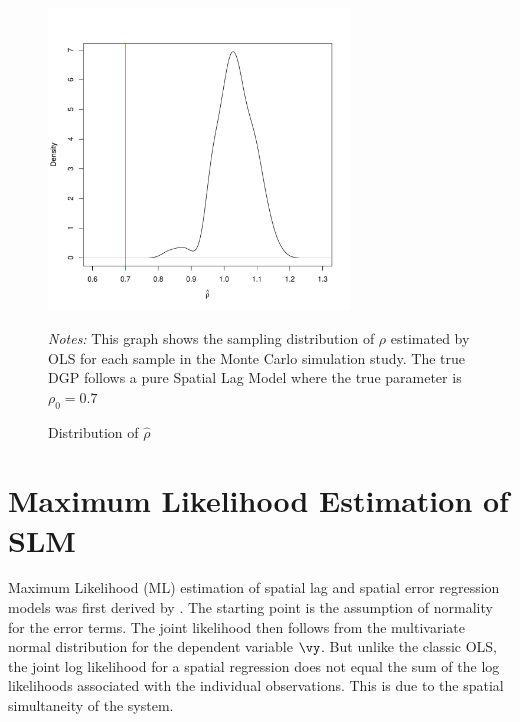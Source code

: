 \documentclass[english,12pt]{book}\usepackage[]{graphicx}\usepackage[]{xcolor}
\newenvironment{knitrout}{}{} %
\begin{document}
\begin{figure}[ht]
  \caption{Distribution of $\widehat{\rho}$}
    \label{fig:ols-rho-sim}
    \centering 
	\begin{minipage}{.9\linewidth}
\begin{knitrout}
\color{fgcolor}

{\centering \includegraphics[width=8cm,height=8cm]{figure/ols-rho-sim-1} 

}


\end{knitrout}
\footnotesize
		\emph{Notes:} This graph shows the sampling distribution of $\rho$ estimated by OLS for each sample in the Monte Carlo simulation study. The true DGP follows a pure Spatial Lag Model where the true parameter is $\rho_0 = 0.7$
	\end{minipage}	
\end{figure}

\section{Maximum Likelihood Estimation of SLM}

Maximum Likelihood (ML) estimation of spatial lag and spatial error regression models was first derived by \cite{ord1975estimation}. The starting point is the assumption of normality for the error terms. The joint likelihood then follows from the multivariate normal distribution for the dependent variable $\vy$. But unlike the classic OLS, the joint log likelihood for a spatial regression does not equal the sum of the log likelihoods associated with the individual observations. This is due to the spatial simultaneity of the system.
\end{document}
